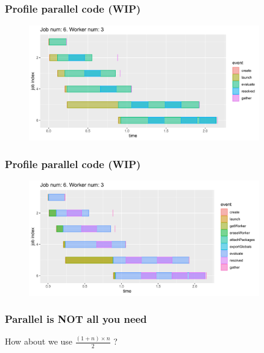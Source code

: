 \documentclass[aspectratio=169,xcolor={dvipsnames,table}]{beamer}
\begin{document}
\begin{frame}
  \frametitle{Profile parallel code (WIP)}
  \begin{figure}[htbp]
    \centering
    \includegraphics[width = 0.9\textwidth]{fig_event}
  \end{figure}
\end{frame}

\begin{frame}
  \frametitle{Profile parallel code (WIP)}
  \begin{figure}[htbp]
    \centering
    \includegraphics[width = 0.9\textwidth]{fig_event2}
  \end{figure}
\end{frame}

\begin{frame}
  \frametitle{Parallel is NOT all you need}
  How about we use $\frac{(1 + n) \times n}{2}$ ?
\end{frame}



\end{document}
